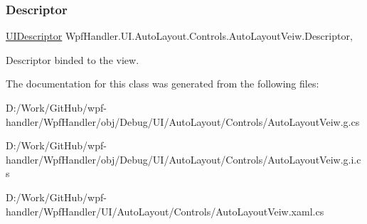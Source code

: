 \subsubsection{\texorpdfstring{Descriptor}{Descriptor}}
{\footnotesize\ttfamily \mbox{\hyperlink{class_wpf_handler_1_1_u_i_1_1_auto_layout_1_1_u_i_descriptor}{U\+I\+Descriptor}} Wpf\+Handler.\+U\+I.\+Auto\+Layout.\+Controls.\+Auto\+Layout\+Veiw.\+Descriptor\hspace{0.3cm}{\ttfamily [get]}, {\ttfamily [set]}}



Descriptor binded to the view. 



The documentation for this class was generated from the following files\+:\begin{DoxyCompactItemize}
\item 
D\+:/\+Work/\+Git\+Hub/wpf-\/handler/\+Wpf\+Handler/obj/\+Debug/\+U\+I/\+Auto\+Layout/\+Controls/Auto\+Layout\+Veiw.\+g.\+cs\item 
D\+:/\+Work/\+Git\+Hub/wpf-\/handler/\+Wpf\+Handler/obj/\+Debug/\+U\+I/\+Auto\+Layout/\+Controls/Auto\+Layout\+Veiw.\+g.\+i.\+cs\item 
D\+:/\+Work/\+Git\+Hub/wpf-\/handler/\+Wpf\+Handler/\+U\+I/\+Auto\+Layout/\+Controls/Auto\+Layout\+Veiw.\+xaml.\+cs\end{DoxyCompactItemize}
